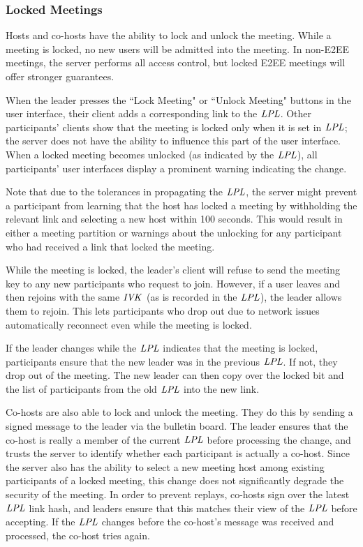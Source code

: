 \subsubsection{Locked Meetings}
\label{subsubsec:lockedmeetings}
Hosts and co-hosts have the ability to lock and unlock the meeting. While a meeting is locked, no
new users will be admitted into the meeting. In non-E2EE meetings, the server performs all access
control, but locked E2EE meetings will offer stronger guarantees.

When the leader presses the ``Lock Meeting" or ``Unlock Meeting" buttons in the user interface,
their client adds a corresponding link to the $\mathit{LPL}$. Other participants' clients show that the
meeting is locked only when it is set in $\mathit{LPL}$; the server does not have the ability to influence
this part of the user interface. When a locked meeting becomes unlocked (as indicated by the
$\mathit{LPL}$), all participants' user interfaces display a prominent warning indicating the change. 

Note that due to the tolerances in propagating the $\mathit{LPL}$, the server might prevent a participant
from learning that the host has locked a meeting by withholding the relevant link and selecting a
new host within 100 seconds. This would result in either a meeting partition or warnings about the
unlocking for any participant who had received a link that locked the meeting.

While the meeting is locked, the leader's client will refuse to send the meeting key to any new
participants who request to join. However, if a user leaves and then rejoins with the same $\mathit{IVK}$
(as is recorded in the $\mathit{LPL}$), the leader allows them to rejoin. This lets participants who drop
out due to network issues automatically reconnect even while the meeting is locked. 

If the leader changes while the $\mathit{LPL}$ indicates that the meeting is locked, participants ensure
that the new leader was in the previous $\mathit{LPL}$. If not, they drop out of the meeting. The new leader
can then copy over the locked bit and the list of participants from the old $\mathit{LPL}$ into the new
link.

Co-hosts are also able to lock and unlock the meeting. They do this by sending a signed message to
the leader via the bulletin board. The leader ensures that the co-host is really a member of the
current $\mathit{LPL}$ before processing the change, and trusts the server to identify whether each
participant is actually a co-host. Since the server also has the ability to select a new meeting
host among existing participants of a locked meeting, this change does not significantly degrade the
security of the meeting. In order to prevent replays, co-hosts sign over the latest $\mathit{LPL}$ link
hash, and leaders ensure that this matches their view of the $\mathit{LPL}$ before accepting. If the $\mathit{LPL}$
changes before the co-host's message was received and processed, the co-host tries again.

